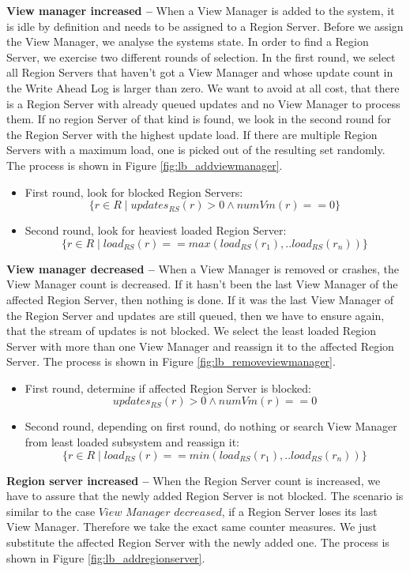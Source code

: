 \documentclass[11pt,a4paper,bibtotoc,idxtotoc,headsepline,footsepline,footexclude,BCOR12mm,DIV13]{scrbook}
\begin{document}
\noindent  
\textbf{View manager increased -- }When a View Manager is added to the system, it is idle by definition and needs to be assigned to a Region Server. Before we assign the View Manager, we analyse the systems state. In order to find a Region Server, we exercise two different rounds of selection. In the first round, we select all Region Servers that haven't got a View Manager and whose update count in the Write Ahead Log is larger than zero. We want to avoid at all cost, that there is a Region Server with already queued updates and no View Manager to process them. If no region Server of that kind is found, we look in the second round for the Region Server with the highest update load. If there are multiple Region Servers with a maximum load, one is picked out of the resulting set randomly. The process is shown in Figure \ref{fig:lb_addviewmanager}.\\
\begin{itemize}
	\item First round, look for blocked Region Servers:
\[\{r \in R \mid updates_{RS}(r) > 0 \wedge numVm(r) == 0\} \]
	\item Second round, look for heaviest loaded Region Server:
\[\{r \in R \mid load_{RS}(r)== max(load_{RS}(r_1),..load_{RS}(r_n))\} \]
\end{itemize}


\noindent  
\textbf{View manager decreased -- }When a View Manager is removed or crashes, the View Manager count is decreased. If it hasn't been the last View Manager of the affected Region Server, then nothing is done. If it was the last View Manager of the Region Server and updates are still queued, then we have to ensure again, that the stream of updates is not blocked. We select the least loaded Region Server with more than one View Manager and reassign it to the affected Region Server. The process is shown in Figure \ref{fig:lb_removeviewmanager}.
\begin{itemize}
	\item First round, determine if affected Region Server is blocked:
\[updates_{RS}(r) > 0 \wedge numVm(r) == 0\]
	\item Second round, depending on first round, do nothing or search View Manager from least loaded subsystem and reassign it:
\[\{r \in R \mid load_{RS}(r)== min(load_{RS}(r_1),..load_{RS}(r_n))\} \]
\end{itemize}

\noindent  
\textbf{Region server increased -- }When the Region Server count is increased, we have to assure that the newly added Region Server is not blocked. The scenario is similar to the case $View$ $Manager$ $decreased$, if a Region Server loses its last View Manager. Therefore we take the exact same counter measures. We just substitute the affected Region Server with the newly added one. The process is shown in Figure \ref{fig:lb_addregionserver}.\\
\end{document}
